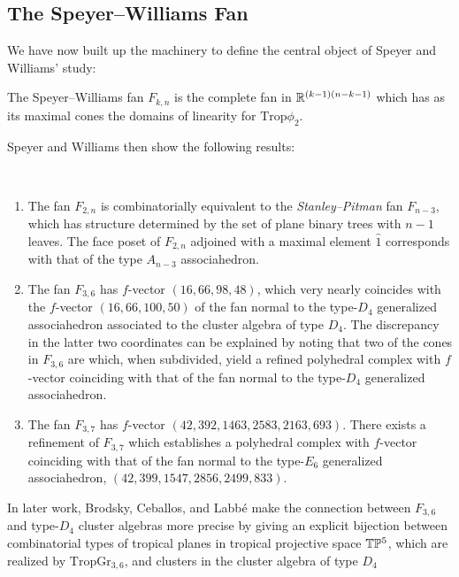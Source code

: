 \documentclass[12pt,letter]{article}
\newcommand{\gr}{\mathrm{Gr}}
\newcommand{\trop}{\mathrm{Trop}}
\begin{document}
  \subsection{The Speyer--Williams Fan} We have now built up the machinery to define the central object of Speyer and Williams' study:
  \begin{definition}
  	The Speyer--Williams fan $F_{k,n}$ is the complete fan in ${\mathbb R}^{(k-1)(n-k-1)}$ which has as its maximal cones the domains of linearity for $\trop\phi_2$. 
  \end{definition}
Speyer and Williams then show the following results:
\begin{theorem}~
\begin{enumerate}
	\item The fan $F_{2,n}$ is combinatorially equivalent to the \emph{Stanley--Pitman} fan $F_{n-3}$, which has structure determined by the set of plane binary trees with $n-1$ leaves. The face poset of $F_{2,n}$ adjoined with a maximal element $\hat{1}$ corresponds with that of the type $A_{n-3}$ associahedron.
	\item The fan $F_{3,6}$ has $f$-vector $(16, 66, 98, 48)$, which very nearly coincides with the $f$-vector $(16,66,100,50)$ of the fan normal to the type-$D_4$ generalized associahedron associated to the cluster algebra of type $D_4$. The discrepancy in the latter two coordinates can be explained by noting that two of the cones in $F_{3,6}$ are  which, when subdivided, yield a refined polyhedral complex with $f$-vector coinciding with that of the fan normal to the type-$D_4$ generalized associahedron.
	\item The fan $F_{3,7}$ has $f$-vector $(42, 392, 1463, 2583, 2163, 693)$. There exists a refinement of $F_{3,7}$ which establishes a polyhedral complex with $f$-vector coinciding with that of the fan normal to the type-$E_6$ generalized associahedron, $(42, 399, 1547, 2856, 2499, 833)$.
\end{enumerate}
\end{theorem}
 
In later work, Brodsky, Ceballos, and Labb\'e \cite{BCL16} make the connection between $F_{3,6}$ and type-$D_4$ cluster algebras more precise by giving an explicit bijection between combinatorial types of tropical planes in tropical projective space ${\mathbb T}{\mathbb P}^5$, which are realized by $\trop\gr_{3,6}$, and clusters in the cluster algebra of type $D_4$ 
  
\end{document}
